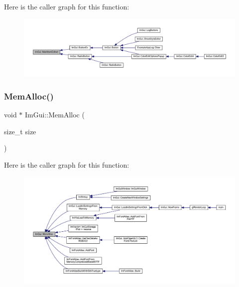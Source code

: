 Here is the caller graph for this function\+:
\nopagebreak
\begin{figure}[H]
\begin{center}
\leavevmode
\includegraphics[width=350pt]{namespace_im_gui_a83036681a36fbee2d35b5b57a1ef72e6_icgraph}
\end{center}
\end{figure}
\mbox{\label{namespace_im_gui_aed896913f2e140cd0ad7431060dba50b}} 
\subsubsection{\texorpdfstring{Mem\+Alloc()}{MemAlloc()}}
{\footnotesize\ttfamily void $\ast$ Im\+Gui\+::\+Mem\+Alloc (\begin{DoxyParamCaption}\item[{size\+\_\+t}]{size }\end{DoxyParamCaption})}

Here is the caller graph for this function\+:
\nopagebreak
\begin{figure}[H]
\begin{center}
\leavevmode
\includegraphics[width=350pt]{namespace_im_gui_aed896913f2e140cd0ad7431060dba50b_icgraph}
\end{center}
\end{figure}
\mbox{\label{namespace_im_gui_a269ec695c6e722ec3da85dae37f0675d}} 
